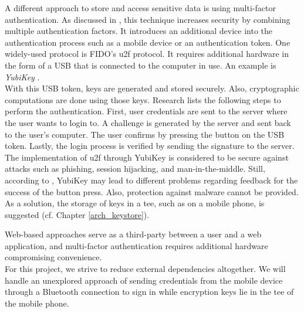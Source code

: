 A different approach to store and access sensitive data is using multi-factor authentication. As discussed in \cite{JacommeK18}, this technique increases security by combining multiple authentication factors. It introduces an additional device into the authentication process such as a mobile device or an authentication token. One widely-used protocol is FIDO's \gls{u2f} protocol. It requires additional hardware in the form of a USB that is connected to the computer in use. An example is \textit{YubiKey} \cite{Yubikey}. \\
With this USB token, keys are generated and stored securely. Also, cryptographic computations are done using those keys. Research \cite{JacommeK18} lists the following steps to perform the authentication. First, user credentials are sent to the server where the user wants to login to. A challenge is generated by the server and sent back to the user's computer. The user confirms by pressing the button on the USB token. Lastly, the login process is verified by sending the signature to the server. \\
The implementation of \gls{u2f} through YubiKey is considered to be secure against attacks such as phishing, session hijacking, and man-in-the-middle. Still, according to \cite{JacommeK18}, YubiKey may lead to different problems regarding feedback for the success of the button press. Also, protection against malware cannot be provided. As a solution, the storage of keys in a \gls{tee}, such as on a mobile phone, is suggested (cf. Chapter \ref{arch_keystore}).

Web-based approaches serve as a third-party between a user and a web application, and multi-factor authentication requires additional hardware compromising convenience. \\
For this project, we strive to reduce external dependencies altogether. We will handle an unexplored approach of sending credentials from the mobile device through a Bluetooth connection to sign in while encryption keys lie in the \gls{tee} of the mobile phone.
